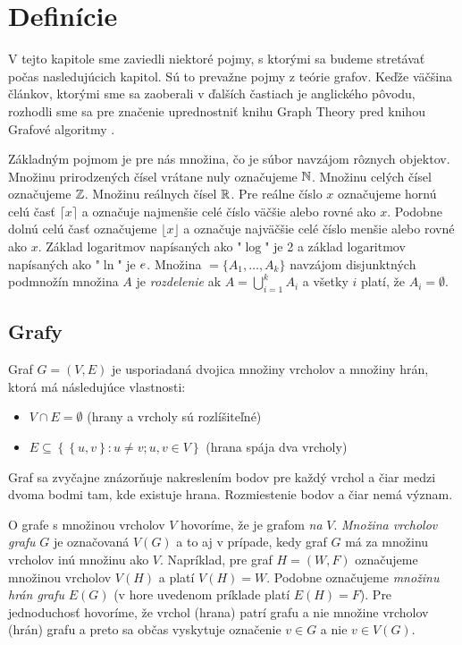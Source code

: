 
\chapter{Definície}\label{chap:def}

V tejto kapitole sme zaviedli niektoré pojmy, s ktorými sa budeme stretávať 
počas nasledujúcich kapitol. Sú to prevažne pojmy z teórie grafov. Keďže 
väčšina článkov, ktorými sme sa zaoberali v ďalších častiach je anglického 
pôvodu, rozhodli sme sa pre značenie uprednostniť knihu Graph Theory 
\citep{diestel} pred knihou Grafové algoritmy \citep{plesnik}. 

Základným pojmom je pre nás množina, čo je súbor navzájom rôznych objektov. 
Množinu prirodzených čísel vrátane nuly označujeme $\mathbb{N}$. Množinu celých 
čísel označujeme $\mathbb{Z}$. Množinu reálnych čísel $\mathbb{R}$. Pre reálne číslo 
$x$ označujeme hornú celú časť $\lceil x\rceil$ a označuje najmenšie celé 
číslo väčšie alebo rovné ako $x$. Podobne dolnú celú časť označujeme 
$\lfloor x\rfloor$ a označuje najväčšie celé číslo menšie alebo rovné ako $x$. 
Základ logaritmov napísaných ako "$\log$" je 2 a základ logaritmov napísaných 
ako "$\ln$" je $e$. Množina $\mathcal = \{A_1, \ldots, A_k\}$ navzájom 
disjunktných podmnožín množina $A$ je \emph{rozdelenie} ak 
$A = \bigcup_{i=1}^{k} A_i$ a všetky $i$ platí, že $A_i = \emptyset$.

\section{Grafy}

Graf $G = (V, E)$ je usporiadaná dvojica množiny vrcholov a množiny hrán, ktorá 
má následujúce vlastnosti: 
\begin{itemize}
	\item $V \cap E = \emptyset$ (hrany a vrcholy sú rozlíšiteľné)
	\item $E \subseteq\left\{ \left\{ u, v\right\} : u \neq v; u, v \in V\right\} $ 
		(hrana spája dva vrcholy)
\end{itemize}

Graf sa zvyčajne znázorňuje nakreslením bodov pre každý vrchol a čiar medzi 
dvoma bodmi tam, kde existuje hrana. Rozmiestenie bodov a čiar nemá význam. 

O grafe s množinou vrcholov $V$ hovoríme, že je grafom \emph{na} $V$. 
\emph{Množina 
vrcholov grafu} $G$ je označovaná $V(G)$ a to aj v prípade, kedy graf $G$ má za 
množinu vrcholov inú množinu ako $V$. Napríklad, pre graf $H = (W, F)$ 
označujeme množinou vrcholov $V(H)$ a platí $V(H) = W$. Podobne označujeme 
\emph{množinu hrán grafu} $E(G)$ (v hore uvedenom príklade platí $E(H) = F$). 
Pre jednoduchosť hovoríme, že vrchol (hrana) patrí grafu a nie množine vrcholov 
(hrán) grafu a preto sa občas vyskytuje označenie $v \in G$ a nie $v \in V(G)$. 

